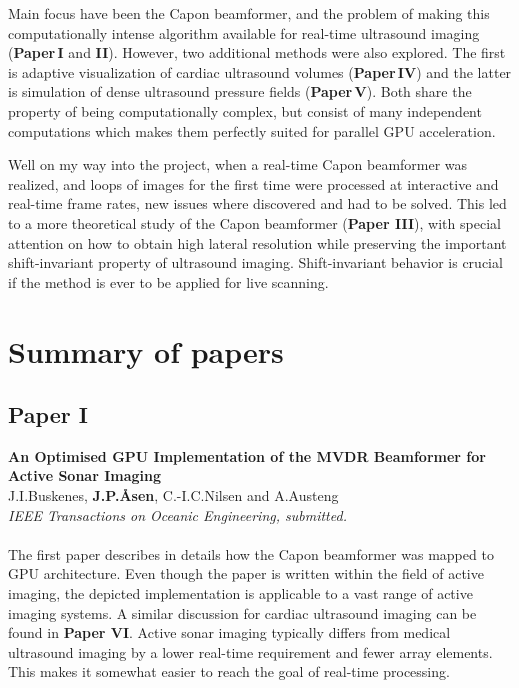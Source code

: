 Main focus have been the Capon beamformer, and the problem of making this computationally intense algorithm available for real-time ultrasound imaging (\textbf{Paper\,I} and \textbf{II}). However, two additional methods were also explored. The first is adaptive visualization of cardiac ultrasound volumes (\textbf{Paper\,IV}) and the latter is simulation of dense ultrasound pressure fields (\textbf{Paper\,V}). Both share the property of being computationally complex, but consist of many independent computations which makes them perfectly suited for parallel GPU acceleration.

Well on my way into the project, when a real-time Capon beamformer was realized, and loops of images for the first time were processed at interactive and real-time frame rates, new issues where discovered and had to be solved. This led to a more theoretical study of the Capon beamformer (\textbf{Paper III}), with special attention on how to obtain high lateral resolution while preserving the important shift-invariant property of ultrasound imaging. Shift-invariant behavior is crucial if the method is ever to be applied for live scanning. 



\section{Summary of papers}

\subsection{Paper I}
\textbf{An Optimised GPU Implementation of the MVDR Beamformer for Active Sonar Imaging}\\
J.\:I.\:Buskenes, \textbf{J.\:P.\:\AA{}sen}, C.-I.\:C.\:Nilsen and A.\:Austeng\\
{\it IEEE Transactions on Oceanic Engineering, submitted.}\\\\
The first paper describes in details how the Capon beamformer was mapped to GPU architecture. Even though the paper is written within the field of active  imaging, the depicted implementation is applicable to a vast range of active imaging systems. A similar discussion for cardiac ultrasound imaging can be found in \textbf{Paper VI}.  Active sonar imaging typically differs from medical ultrasound imaging by a lower real-time requirement and fewer array elements. This makes it somewhat easier to reach the goal of real-time processing. 

